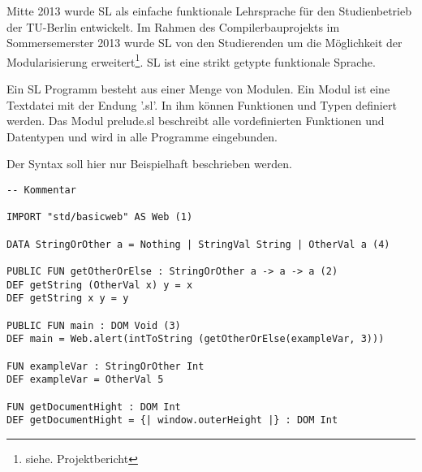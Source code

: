 \documentclass[12pt]{scrreprt}
\begin{document}
Mitte 2013 wurde \ac{SL} als einfache funktionale Lehrsprache für den Studienbetrieb der TU-Berlin entwickelt. Im Rahmen des Compilerbauprojekts im Sommersemerster 2013 wurde \ac{SL} von den Studierenden um die Möglichkeit der Modularisierung erweitert\footnote{siehe. Projektbericht}. \ac{SL} ist eine strikt getypte funktionale Sprache.

Ein \ac{SL} Programm besteht aus einer Menge von Modulen. Ein Modul ist eine Textdatei mit der Endung '.sl'. In ihm können Funktionen und Typen definiert werden. Das Modul prelude.sl beschreibt alle vordefinierten Funktionen und Datentypen und wird in alle Programme eingebunden.

Der Syntax soll hier nur Beispielhaft beschrieben werden. 

\begin{lstlisting}[caption=Beispielmodul, label=lst:bsp1]
-- Kommentar

IMPORT "std/basicweb" AS Web (1)

DATA StringOrOther a = Nothing | StringVal String | OtherVal a (4)

PUBLIC FUN getOtherOrElse : StringOrOther a -> a -> a (2)
DEF getString (OtherVal x) y = x
DEF getString x y = y

PUBLIC FUN main : DOM Void (3)
DEF main = Web.alert(intToString (getOtherOrElse(exampleVar, 3)))

FUN exampleVar : StringOrOther Int
DEF exampleVar = OtherVal 5

FUN getDocumentHight : DOM Int
DEF getDocumentHight = {| window.outerHeight |} : DOM Int

\end{lstlisting}
\end{document}
